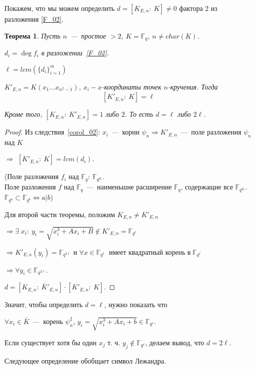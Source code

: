 \documentclass[12pt]{article}
\newcommand{\F}{{{\mathbb F}}}
\newtheorem{theorem}{Теорема}
\theoremstyle{definition}
\theoremstyle{definition}
\theoremstyle{definition}
\begin{document}
Покажем, что мы можем определить $d = [ {{K_{E,n}}:\:K} ] \ne 0$ фактора 2 из разложения \ref{F_02}. 

\begin{theorem}
	Пусть $n$~---~простое $> 2$, $K = {\F_q}$, $n \ne char( K )$.
	
	${d_i} = \deg {f_i}$ в разложении~\eqref{F_02}.
	
	$\ell = {lcm}( {\{ {{d_i}} \}_{i = 1}^m} )$
	
	$K'_{E,n} = K( {{x_1} \ldots {x_{{n^2} - 1}}}) $, ${x_i} - x$-координаты точек $n$-кручения. Тогда 
	$$[ {K'_{E,n}:\:K} ] = \ell
	$$
	
	Кроме того, $[ {{K_{E,n}}:\:K'_{E,n}} ] = 1$ либо $2$. То есть $d = \ell$ либо $2\ell$. 
\end{theorem}
\begin{proof}
    Из следствия~\ref{corol_02}: $x_i$~---~корни ${\psi _n} \Rightarrow K'_{E,n}$~---~поле разложения ${\psi _n}$ над $K$
    
    $ \Rightarrow $ $[ {K{'_{E,n}}:\:K} ] = lcm( {{d_i}} )$.
    
    (Поле разложения $f_i$ над ${\F_q}:\:\F_{q^{d_i}}$. \\
    Поле разложения $f$ над ${\F_q}$~---~наименьшие расширение ${\F_q}$, содержащие все ${\F_{q^{d_i}}}$. \\
    $\F_{q^a} \subset {\F_{q^b}} \Leftrightarrow a | b $)
    
    Для второй части теоремы, положим ${K_{E,n}} \ne K'_{E,n}$
    
    $ \Rightarrow \exists \; {x_i}:\:{y_i} = \sqrt {x_i^3 + A{x_i} + B}  \notin K'_{E,n} = {\F_{{q^\ell}}}$
    
    $ \Rightarrow K{'_{E,n}}(y_i) = \F_{q^{2\ell}}$ и $\forall x \in \F_{q^\ell}$ $\mathop {{\text{ имеет квадратный корень в }}} \F_{q^\ell}$
    
    $ \Rightarrow \forall {y_i} \in \F_{q^{2\ell}}$.
    
    $d = [ {{K_{E,n}}:\:\bar K'_{E,n}} ] \cdot [ {K'_{E,n}:\:K} ].$
\end{proof}

Значит, чтобы определить $d = \ell$, нужно показать что 

$\forall {x_i} \in \bar K$~---~корень $\psi _n^2$, ${y_i} = \sqrt {x_i^3 + A{x_i} + b} \in  \F_{q^\ell}$. 

Если существует хотя бы один ${x_j}$ т. ч. ${y_j} \notin \F_{q^\ell}$, делаем вывод, что $d = 2\ell$.

Следующее определение обобщает символ Лежандра.
\end{document}
